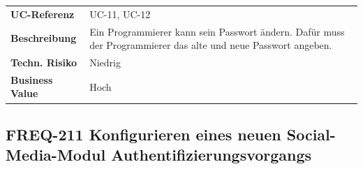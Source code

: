\begin{longtable}[c]{@{}ll@{}}
\toprule
\begin{minipage}[t]{0.20\columnwidth}\raggedright\strut
\textbf{UC-Referenz}
\strut\end{minipage} &
\begin{minipage}[t]{0.74\columnwidth}\raggedright\strut
UC-11, UC-12
\strut\end{minipage}\tabularnewline
\begin{minipage}[t]{0.20\columnwidth}\raggedright\strut
\textbf{Beschreibung}
\strut\end{minipage} &
\begin{minipage}[t]{0.74\columnwidth}\raggedright\strut
Ein Programmierer kann sein Passwort ändern. Dafür muss der
Programmierer das alte und neue Passwort angeben.
\strut\end{minipage}\tabularnewline
\begin{minipage}[t]{0.20\columnwidth}\raggedright\strut
\textbf{Techn. Risiko}
\strut\end{minipage} &
\begin{minipage}[t]{0.74\columnwidth}\raggedright\strut
Niedrig
\strut\end{minipage}\tabularnewline
\begin{minipage}[t]{0.20\columnwidth}\raggedright\strut
\textbf{Business Value}
\strut\end{minipage} &
\begin{minipage}[t]{0.74\columnwidth}\raggedright\strut
Hoch
\strut\end{minipage}\tabularnewline
\bottomrule
\end{longtable}

\subsection{FREQ-211 Konfigurieren eines neuen Social-Media-Modul
Authentifizierungsvorgangs}\label{freq-211-konfigurieren-eines-neuen-social-media-modul-authentifizierungsvorgangs}

